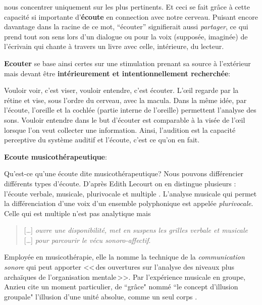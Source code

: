 nous concentrer uniquement sur les plus  pertinents. Et ceci se fait grâce à cette capacité si importante
d'\textbf{écoute} en connection avec notre cerveau.
Puisant encore davantage dans  la racine de ce mot, ``écouter'' signifierait
aussi \emph{partager}, ce qui prend tout son sens lors d'un dialogue ou
pour la voix (supposée, imaginée) de  l'écrivain qui
 chante à travers un livre avec celle, intérieure, du lecteur.


  \textbf{Ecouter} se base ainsi certes sur une stimulation prenant sa source à
l'extérieur mais devant être \textbf{ intérieurement et intentionnellement
	recherchée}:

  Vouloir voir, c'est viser, vouloir entendre, c'est
   écouter.
 L'\oe il regarde par la rétine et  vise, sous l'ordre du
  cerveau, avec la macula. Dans la même idée, par l'écoute,
  l'oreille et la cochlée (partie interne de l'oreille) permettent
  l'analyse des sons. Vouloir entendre dans le but d'écouter est comparable  à
  la visée de l'\oe il lorsque l'on veut collecter une
  information.
   Ainsi, l'audition est la capacité perceptive du système auditif et l'écoute, c'est ce qu'on en fait.


      \textbf{Ecoute musicothérapeutique}:

Qu'est-ce qu'une écoute dite musicothérapeutique?
Nous pouvons  différencier différents types d'écoute. D'après Edith Lecourt
on en distingue plusieurs : l'écoute verbale, musicale, plurivocale et multiple
\autocite[182]{lecourt:decouvrir}.
 L'analyse musicale qui permet la différenciation d'une voix d'un ensemble polyphonique est appelée \emph{plurivocale}. Celle qui est multiple n'est pas analytique  mais
 \begin{quote}
 	 [\ldots] \textit{ouvre une disponibilité, met en suspens les grilles verbale et musicale} [\ldots] \emph{pour parcourir le vécu sonoro-affectif}\autocite[183]{lecourt:decouvrir}.
 \end{quote}
 Employée en musicothérapie, elle la nomme la technique de la  \emph{communication sonore} qui peut apporter
 <<\,des ouvertures sur l'analyse des niveaux plus archaïques de l'organisation mentale\,>>\autocite[154]{lecourt:decouvrir}.
 Par l'expérience musicale en groupe, Anzieu cite un moment
 particulier, de ``grâce"  nommé ``le concept d'illusion groupale"
 l'illusion d'une unité absolue, comme un seul corps \autocite[113]{AnzieuMoiPeau}.

